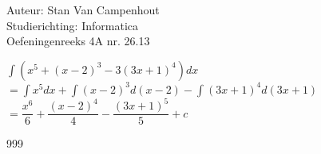 \documentclass[a4paper]{article}
\begin{document}
  
\noindent \large Auteur: Stan Van Campenhout \\
\noindent \large Studierichting:  Informatica\\
\noindent \large Oefeningenreeks 4A nr. 26.13\\

\medskip

\normalsize

$ \displaystyle\int\left(x^5+\left(x-2\right)^3-3\left(3x+1\right)^4\right)dx $\\

$ = \displaystyle\int x^5dx + \displaystyle\int\left(x-2\right)^3d\left(x-2\right) - \displaystyle\int\left(3x+1\right)^4d\left(3x+1\right) $\\

$ = \dfrac{x^6}{6} + \dfrac{\left(x-2\right)^4}{4} - \dfrac{\left(3x+1\right)^5}{5} + c $\\

\begin{thebibliography}{999}
\end{thebibliography}
\end{document}
